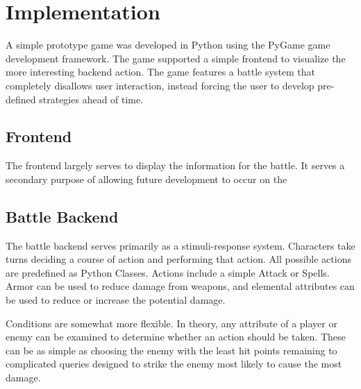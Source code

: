 \documentclass[11pt]{article}
\begin{document}

\section{Implementation}

A simple prototype game was developed in Python using the PyGame game development framework.  The game supported a simple frontend to visualize the more interesting backend action. The game features a battle system that completely disallows user interaction, instead forcing the user to develop pre-defined strategies ahead of time.

\subsection{Frontend}

The frontend largely serves to display the information for the battle.  It serves a secondary purpose of allowing future development to occur on the 

\subsection{Battle Backend}

The battle backend serves primarily as a stimuli-response system.  Characters take turns deciding a course of action and performing that action.  All possible actions are predefined as Python Classes.  Actions include a simple Attack or Spells.  Armor can be used to reduce damage from weapons, and elemental attributes can be used to reduce or increase the potential damage.  

Conditions are somewhat more flexible.  In theory, any attribute of a player or enemy can be examined to determine whether an action should be taken.  These can be as simple as choosing the enemy with the least hit points remaining to complicated queries designed to strike the enemy most likely to cause the most damage.

\end{document}
